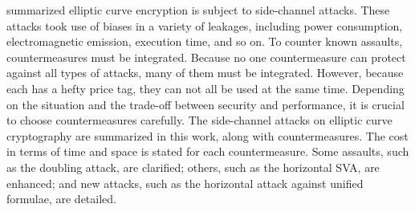 \cite{Danger2013} summarized elliptic curve encryption is subject to side-channel attacks. These attacks took use of biases in a variety of leakages, including power consumption, electromagnetic emission, execution time, and so on. To counter known assaults, countermeasures must be integrated. Because no one countermeasure can protect against all types of attacks, many of them must be integrated. However, because each has a hefty price tag, they can not all be used at the same time. Depending on the situation and the trade-off between security and performance, it is crucial to choose countermeasures carefully. The side-channel attacks on elliptic curve cryptography are summarized in this work, along with countermeasures. The cost in terms of time and space is stated for each countermeasure. Some assaults, such as the doubling attack, are clarified; others, such as the horizontal SVA, are enhanced; and new attacks, such as the horizontal attack against unified formulae, are detailed.